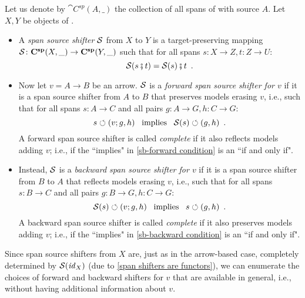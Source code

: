 \begin{definition}
Let us denote by $\cat{C^{sp}}(A,\_)$ the collection of all spans of  with source $A$. Let $X,Y$ be objects of . 
\begin{itemize}[topsep=\smallskipamount]
\item A \emph{span source shifter} $\mathcal{S}$ from $X$ to $Y$ is a target-preserving mapping $\mathcal{S} \colon \mathbf{C^{sp}}(X,\_) \rightarrow \mathbf{C^{sp}}(Y, \_)$
such that for all spans $s:X\to Z,t:Z\to U$:
%
\begin{equation}\eqlabel{span shifters are functors}
\cS(s \spcomp t) = \cS(s)\spcomp t \enspace.
\end{equation}
%
\item Now let $v=A\to B$ be an arrow. $\mathcal{S}$ is a \emph{forward span source shifter for $v$} if it is a span source shifter from $A$ to $B$ that preserves models erasing $v$, i.e., such that for all spans $s:A\to C$ and all pairs $g:A\to G,h:C \to G$:
%
\begin{equation}\eqlabel{sb-forward condition}
s\commutes (v;g,h) \enspace\text{ implies }\enspace \cS(s) \commutes (g,h) \enspace.
\end{equation}
%
A forward span source shifter is called \emph{complete} if it also reflects models adding $v$; i.e., if the ``implies" in \eqref{sb-forward condition} is an ``if and only if".

\item Instead, $\mathcal{S}$ is a \emph{backward span source shifter for $v$} if it is a span source shifter from $B$ to $A$ that reflects models erasing $v$, i.e., such that for all spans $s:B\to C$ and all pairs $g:B\to G,h:C\to G$:
%
\begin{equation}\eqlabel{sb-backward condition}
\cS(s) \commutes (v;g,h) \enspace\text{ implies }\enspace s\commutes (g,h) \enspace.
\end{equation}
%
A backward span source shifter is called \emph{complete} if it also preserves models adding $v$; i.e., if the ``implies" in \eqref{sb-backward condition} is an ``if and only if".
\end{itemize}
\end{definition}
%
Since span source shifters from $X$ are, just as in the arrow-based case, completely determined by $\mathcal{S}(\mathit{id}_X)$ (due to \eqref{span shifters are functors}), we can enumerate the choices of forward and backward shifters for $v$ that are available in general, i.e., without having additional information about $v$.
